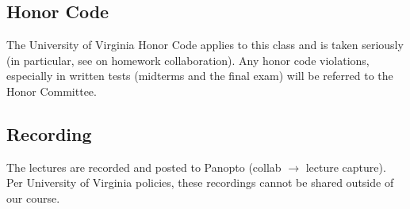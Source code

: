 \documentclass[oneside,11pt]{amsart}
\begin{document}
\subsection{Honor Code} The University of Virginia Honor Code applies to this
class and is taken seriously (in particular, 
see  on homework collaboration).
Any honor code violations,
especially in written tests (midterms and the final exam)
will be referred to the
Honor Committee.

\subsection{Recording}

The lectures are recorded and posted to Panopto 
(collab $\to$ lecture capture).
Per University of Virginia
policies,
these recordings cannot be shared outside of our course.
\end{document}
